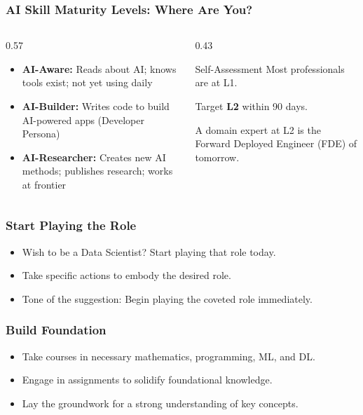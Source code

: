 \begin{frame}[fragile]\frametitle{AI Skill Maturity Levels: Where Are You?}
\begin{columns}
    \begin{column}[T]{0.57\linewidth}
\begin{itemize}
  \item[\textbf{L1}] \textbf{AI-Aware:} Reads about AI; knows tools exist; not yet using daily
  \item[\textbf{L2}] \textbf{AI-Builder:} Writes code to build AI-powered apps (Developer Persona)
  \item[\textbf{L3}] \textbf{AI-Researcher:} Creates new AI methods; publishes research; works at frontier
\end{itemize}
    \end{column}
    \begin{column}[T]{0.43\linewidth}
\begin{block}{Self-Assessment}
Most professionals are at L1.

\vspace{4pt}
Target \textbf{L2} within 90 days.

\vspace{4pt}
A domain expert at L2 is the Forward Deployed Engineer (FDE) of tomorrow.
\end{block}
    \end{column}
\end{columns}
\end{frame}

\begin{frame}[fragile]\frametitle{Start Playing the Role}


        \begin{itemize}
            \item Wish to be a Data Scientist? Start playing that role today.
            \item Take specific actions to embody the desired role.
            \item Tone of the suggestion: Begin playing the coveted role immediately.
        \end{itemize}
			
\end{frame}

\begin{frame}[fragile]\frametitle{Build Foundation}


        \begin{itemize}
            \item Take courses in necessary mathematics, programming, ML, and DL.
            \item Engage in assignments to solidify foundational knowledge.
            \item Lay the groundwork for a strong understanding of key concepts.
        \end{itemize}
			
\end{frame}

